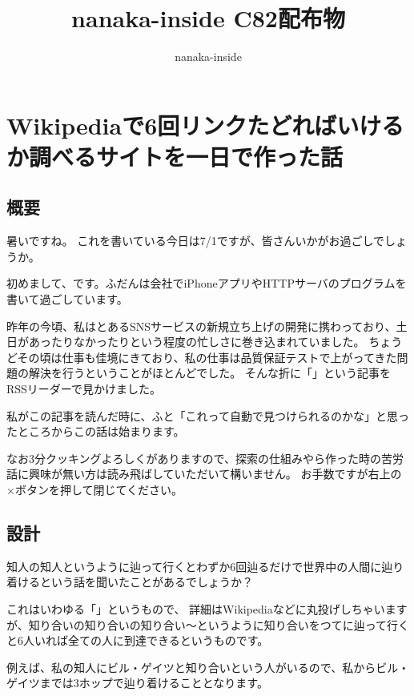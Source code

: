 \documentclass[b5paper]{jsarticle}
\title{nanaka-inside C82配布物}
\author{nanaka-inside}
\begin{document}
\maketitle

\section{Wikipediaで6回リンクたどればいけるか調べるサイトを一日で作った話}
\subsection{概要}
暑いですね。
これを書いている今日は7/1ですが、皆さんいかがお過ごしでしょうか。

初めまして、です。ふだんは会社でiPhoneアプリやHTTPサーバのプログラムを書いて過ごしています。

昨年の今頃、私はとあるSNSサービスの新規立ち上げの開発に携わっており、土日があったりなかったりという程度の忙しさに巻き込まれていました。
ちょうどその頃は仕事も佳境にきており、私の仕事は品質保証テストで上がってきた問題の解決を行うということがほとんどでした。
そんな折に「」という記事をRSSリーダーで見かけました。

私がこの記事を読んだ時に、ふと「これって自動で見つけられるのかな」と思ったところからこの話は始まります。

なお3分クッキングよろしくがありますので、探索の仕組みやら作った時の苦労話に興味が無い方は読み飛ばしていただいて構いません。
お手数ですが右上の×ボタンを押して閉じてください。

\subsection{設計}
知人の知人というように辿って行くとわずか6回辿るだけで世界中の人間に辿り着けるという話を聞いたことがあるでしょうか？

これはいわゆる「」というもので、
詳細はWikipediaなどに丸投げしちゃいますが、知り合いの知り合いの知り合い〜というように知り合いをつてに辿って行くと6人いれば全ての人に到達できるというものです。

例えば、私の知人にビル・ゲイツと知り合いという人がいるので、私からビル・ゲイツまでは3ホップで辿り着けることとなります。
\end{document}
